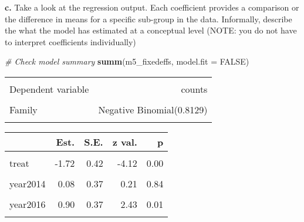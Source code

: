 \documentclass[
]{article}
\newenvironment{Shaded}{\begin{snugshade}}{\end{snugshade}}
\newcommand{\AttributeTok}[1]{\textcolor[rgb]{0.13,0.29,0.53}{#1}}
\newcommand{\CommentTok}[1]{\textcolor[rgb]{0.56,0.35,0.01}{\textit{#1}}}
\newcommand{\ConstantTok}[1]{\textcolor[rgb]{0.56,0.35,0.01}{#1}}
\newcommand{\FunctionTok}[1]{\textcolor[rgb]{0.13,0.29,0.53}{\textbf{#1}}}
\newcommand{\NormalTok}[1]{#1}
\begin{document}
\textbf{c.} Take a look at the regression output. Each coefficient
provides a comparison or the difference in means for a specific
sub-group in the data. Informally, describe the what the model has
estimated at a conceptual level (NOTE: you do not have to interpret
coefficients individually)

\begin{Shaded}
\begin{Highlighting}[]
\CommentTok{\# Check model summary}
\FunctionTok{summ}\NormalTok{(m5\_fixedeffs, }\AttributeTok{model.fit =} \ConstantTok{FALSE}\NormalTok{)}
\end{Highlighting}
\end{Shaded}

\begin{table}[!h]
\centering
\begin{tabular}{lr}
\toprule
\cellcolor{gray!10}{Observations} & \cellcolor{gray!10}{252}\\
Dependent variable & counts\\
\cellcolor{gray!10}{Type} & \cellcolor{gray!10}{Generalized linear model}\\
Family & Negative Binomial(0.8129)\\
\cellcolor{gray!10}{Link} & \cellcolor{gray!10}{log}\\
\bottomrule
\end{tabular}
\end{table}  \begin{table}[!h]
\centering
\begin{threeparttable}
\begin{tabular}{lrrrr}
\toprule
  & Est. & S.E. & z val. & p\\
\midrule
\cellcolor{gray!10}{(Intercept)} & \cellcolor{gray!10}{2.35} & \cellcolor{gray!10}{0.26} & \cellcolor{gray!10}{8.89} & \cellcolor{gray!10}{0.00}\\
treat & -1.72 & 0.42 & -4.12 & 0.00\\
\cellcolor{gray!10}{year2013} & \cellcolor{gray!10}{-0.35} & \cellcolor{gray!10}{0.38} & \cellcolor{gray!10}{-0.93} & \cellcolor{gray!10}{0.35}\\
year2014 & 0.08 & 0.37 & 0.21 & 0.84\\
\cellcolor{gray!10}{year2015} & \cellcolor{gray!10}{0.86} & \cellcolor{gray!10}{0.37} & \cellcolor{gray!10}{2.32} & \cellcolor{gray!10}{0.02}\\
\addlinespace
year2016 & 0.90 & 0.37 & 2.43 & 0.01\\
\cellcolor{gray!10}{year2017} & \cellcolor{gray!10}{1.56} & \cellcolor{gray!10}{0.37} & \cellcolor{gray!10}{4.25} & \cellcolor{gray!10}{0.00}\\

\end{tabular}
\end{threeparttable}
\end{table}
\end{document}
